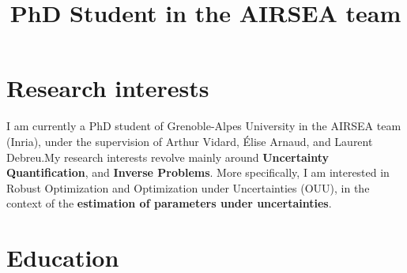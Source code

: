 \documentclass[11pt,a4paper,sans]{moderncv} %
\title{PhD Student in the AIRSEA team} %
\begin{document}








\makecvtitle%

\section{Research interests}
I am currently a PhD student of Grenoble-Alpes University in the AIRSEA team (Inria), under the supervision of Arthur Vidard, Élise Arnaud, and Laurent Debreu.\@ My research interests revolve mainly around \textbf{Uncertainty Quantification}, and \textbf{Inverse Problems}. More specifically, I am interested in Robust Optimization and Optimization under Uncertainties (OUU), in the context of the \textbf{estimation of parameters under uncertainties}.
\section{Education}
\end{document}
